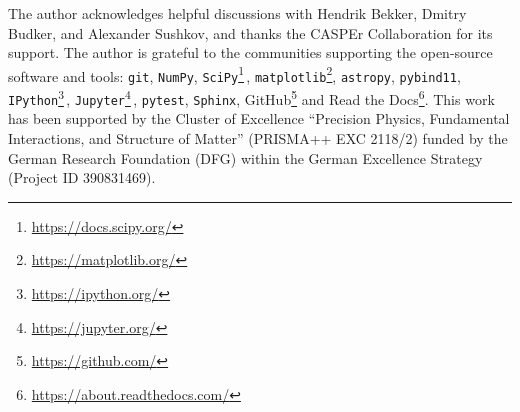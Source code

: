 \documentclass[%
 reprint,
nofootinbib,
 amsmath,amssymb,
 aps,
]{revtex4-2}
\begin{document}
\begin{acknowledgments}

The author acknowledges helpful discussions with Hendrik Bekker, Dmitry Budker, and Alexander Sushkov, and thanks the CASPEr Collaboration for its support. 
The author is grateful to the communities supporting the open-source software and tools: \texttt{git}, \texttt{NumPy}, 
\texttt{SciPy}\footnote{\url{https://docs.scipy.org/}}\,\cite{Virtanen2020_SciPy}, 
\texttt{matplotlib}\footnote{\url{https://matplotlib.org/}}, 
\texttt{astropy}, 
\texttt{pybind11}, 
\texttt{IPython}\footnote{\url{https://ipython.org/}}\,\cite{Perez2007_IPython}, 
\texttt{Jupyter}\footnote{\url{https://jupyter.org/}}\,\cite{Granger2021_Jupyter}, 
\texttt{pytest}, 
\texttt{Sphinx}, 
GitHub\footnote{\url{https://github.com/}} 
and 
Read the Docs\footnote{\url{https://about.readthedocs.com/}}. 
This work has been supported by the Cluster of Excellence ``Precision Physics, Fundamental Interactions, and Structure of Matter'' (PRISMA++ EXC 2118/2) funded by the
German Research Foundation (DFG) within the German Excellence Strategy (Project ID 390831469).

\end{acknowledgments}



\end{document}
